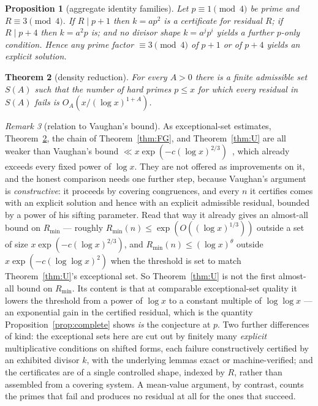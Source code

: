 \documentclass[11pt]{article}
\theoremstyle{plain}
\newtheorem{theorem}{Theorem}[section]
\newtheorem{proposition}[theorem]{Proposition}
\theoremstyle{remark}
\newtheorem{remark}[theorem]{Remark}
\theoremstyle{plain}
\numberwithin{equation}{section}
\begin{document}
\begin{proposition}[aggregate identity families]\label{prop:agg}
Let $p \equiv 1 \pmod 4$ be prime and $R \equiv 3 \pmod 4$. If
$R \mid p+1$ then $k = a p^2$ is a certificate for residual $R$; if
$R \mid p+4$ then $k = a^2 p$ is; and no divisor shape $k = a^j p^i$
yields a further $p$-only condition. Hence any prime factor
$\equiv 3 \pmod 4$ of $p+1$ or of $p+4$ yields an explicit solution.
\end{proposition}

\begin{theorem}[density reduction]\label{thm:D}
For every $A > 0$ there is a finite admissible set $S(A)$ such that the
number of hard primes $p \le x$ for which every residual in $S(A)$ fails
is $O_A\!\left(x/(\log x)^{1+A}\right)$.
\end{theorem}

\begin{remark}[relation to Vaughan's bound]\label{rem:vaughan}
As exceptional-set estimates, Theorem~\ref{thm:D}, the chain of
Theorem~\ref{thm:FG}, and Theorem~\ref{thm:U} are all weaker than
Vaughan's bound
$\ll x \exp(-c(\log x)^{2/3})$~\cite{Vaughan}, which already exceeds
every fixed power of $\log x$. They are not offered as improvements
on it, and the honest comparison needs one further step, because
Vaughan's argument is \emph{constructive}: it proceeds by covering
congruences, and every $n$ it certifies comes with an explicit
solution and hence with an explicit admissible residual, bounded by
a power of his sifting parameter. Read that way it already gives an
almost-all bound on $R_{\min}$ --- roughly
$R_{\min}(n) \le \exp(O((\log x)^{1/3}))$ outside a set of size
$x\exp(-c(\log x)^{2/3})$, and $R_{\min}(n) \le (\log x)^{\theta}$
outside $x\exp(-c(\log\log x)^2)$ when the threshold is set to match
Theorem~\ref{thm:U}'s exceptional set. So Theorem~\ref{thm:U} is not
the first almost-all bound on $R_{\min}$. Its content is that at
comparable exceptional-set quality it lowers the threshold from a
power of $\log x$ to a constant multiple of $\log\log x$ --- an
exponential gain in the certified residual, which is the quantity
Proposition~\ref{prop:complete} shows \emph{is} the conjecture at
$p$. Two further differences of kind: the exceptional sets here are
cut out by finitely many \emph{explicit} multiplicative conditions on
shifted forms, each failure constructively certified by an exhibited
divisor $k$, with the underlying lemmas exact or machine-verified;
and the certificates are of a single controlled shape, indexed by
$R$, rather than assembled from a covering system. A mean-value
argument, by contrast, counts the primes that fail and produces no
residual at all for the ones that succeed.
\end{remark}
\end{document}
